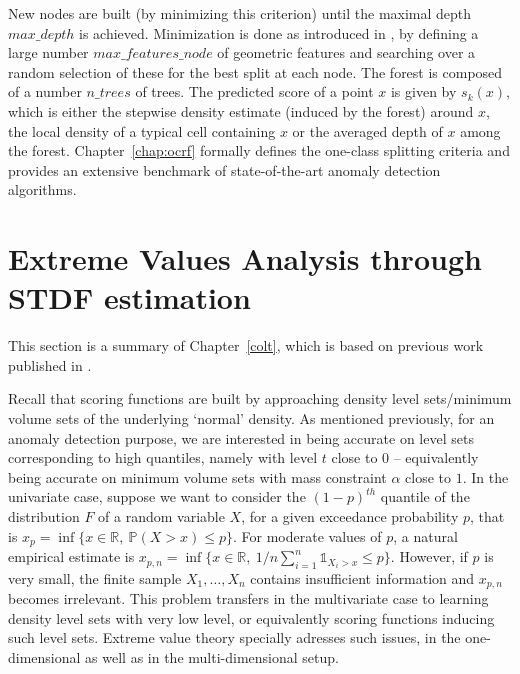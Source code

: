 New nodes are built (by minimizing this criterion) until the maximal depth $max\_depth$ is achieved.
Minimization is done as introduced in \citep{Amit1997}, by defining a large number $max\_features\_node$ of geometric features and searching over a random selection of these for the best split at each node.
%
The forest is composed of a number $n\_trees$ of trees. The predicted score of a point $x$ is given by $s_k(x)$, which is either the stepwise density estimate (induced by the forest) around $x$, the local density of a typical cell containing $x$ or the averaged depth of $x$ among the forest. Chapter~\ref{chap:ocrf} formally defines the one-class splitting criteria and provides an extensive benchmark of state-of-the-art anomaly detection algorithms.




\section{Extreme Values Analysis through STDF estimation}
\label{resume:stdf}
This section is a summary of Chapter~\ref{colt}, which is based on previous work published in \cite{COLT15}.

Recall that scoring functions are built
by approaching density level sets/minimum volume sets of the underlying `normal' density. As mentioned previously, for an anomaly detection purpose, we are interested in being accurate on level sets corresponding to high quantiles, namely with level $t$ close to $0$ -- equivalently being accurate on minimum volume sets with mass constraint $\alpha$ close to $1$.  
%
In the univariate case, suppose we want to consider the $(1-p)^{th}$ quantile of the distribution $F$ of a random variable $X$, for a given exceedance probability $p$, that is $x_p = \inf\{x \in \mathbb{R},~ \mathbb{P}(X > x) \le p\}$. For moderate values of $p$, a natural empirical estimate is $x_{p,n} = \inf\{x \in \mathbb{R},~ 1/n \sum_{i=1}^n \mathds{1}_{X_i > x}\le p\}$.
However,  if $p$ is very small, the finite  sample $X_1,\ldots, X_n$  contains insufficient information and $x_{p,n}$ becomes irrelevant.
%
This problem transfers in the multivariate case to learning density level sets with very low level, or equivalently scoring functions inducing such level sets.
%
Extreme value theory specially adresses such issues, in the one-dimensional as well as in the multi-dimensional setup.



